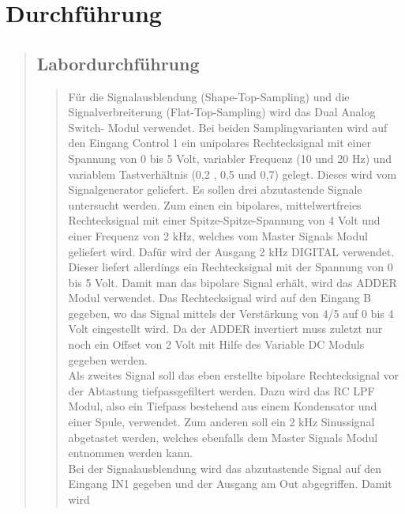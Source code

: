 

\section{Durchführung}
\begin{quote}
    
    
    \subsection{Labordurchführung}
    \begin{quote}
         Für die Signalausblendung (Shape-Top-Sampling) und die
     Signalverbreiterung (Flat-Top-Sampling) wird das Dual Analog Switch- Modul
     verwendet.
     Bei beiden Samplingvarianten wird auf den Eingang Control 1 ein
     unipolares Rechtecksignal mit einer Spannung von 0 bis 5 Volt, variabler
     Frequenz (10 und 20 Hz) und variablem Tastverhältnis (0,2 , 0,5 und 0,7)
     gelegt. Dieses wird vom Signalgenerator geliefert.
     Es sollen drei abzutastende Signale untersucht werden. Zum einen ein
     bipolares, mittelwertfreies Rechtecksignal mit einer Spitze-Spitze-Spannung von 4 Volt und einer
     Frequenz von 2 kHz, welches vom Master Signals Modul geliefert wird. Dafür
     wird der Ausgang 2 kHz DIGITAL verwendet. Dieser liefert allerdings ein
     Rechtecksignal mit der Spannung von 0 bis 5 Volt. Damit man das
     bipolare Signal erhält, wird das ADDER Modul verwendet. Das Rechtecksignal
     wird auf den Eingang B gegeben, wo das Signal mittels der Verstärkung von
     4/5 auf 0 bis 4 Volt eingestellt wird. Da der ADDER invertiert muss zuletzt
     nur noch ein Offset von 2 Volt mit Hilfe des Variable DC Moduls gegeben
     werden.\\
     \noindent\hspace*{4mm}%
     Als zweites Signal soll das eben erstellte bipolare Rechtecksignal vor
     der Abtastung tiefpassgefiltert werden. Dazu wird das RC LPF Modul, also
     ein Tiefpass bestehend aus einem Kondensator und einer Spule, verwendet.
     Zum anderen soll ein 2 kHz Sinussignal abgetastet werden, welches ebenfalls
     dem Master Signals Modul entnommen werden kann.\\
     \noindent\hspace*{4mm}%
     Bei der Signalausblendung wird das abzutastende Signal auf den Eingang
     IN1 gegeben und der Ausgang am Out abgegriffen. Damit wird

\end{quote}
\end{quote}
